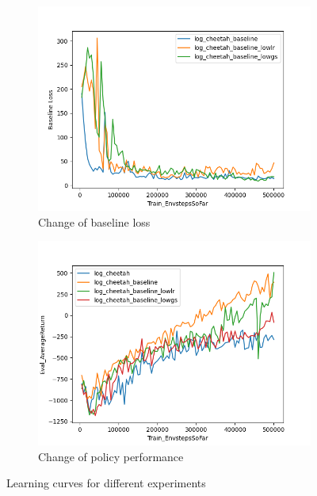 \documentclass{article}
\begin{document}
\begin{itemize}
\MYSOLUTION

\begin{figure}[H]
        \centering
        \begin{subfigure}{0.45\textwidth}
                \centering
                \includegraphics[width=\linewidth]{./report/assets/all_E2_baseline_hyperparam.png} %
                \caption{Change of baseline loss}
                \label{fig:E2-baseline-loss}
        \end{subfigure}
        \hfill
        \begin{subfigure}{0.45\textwidth}
                \centering
                \includegraphics[width=\linewidth]{./report/assets/all_E2_comp.png}
                \caption{Change of policy performance}
                \label{fig:E2-policy-performance}
        \end{subfigure}
        \caption{Learning curves for different experiments}
        \label{fig:E2-change-hyperparam}
\end{figure}


\end{itemize}
\end{document}
